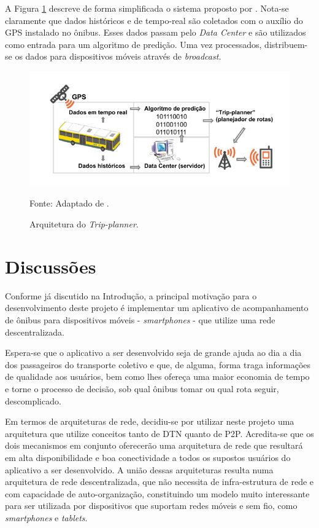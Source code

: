 A Figura \ref{fig:archLisbon} descreve de forma simplificada o sistema proposto por . Nota-se claramente que dados históricos e de tempo-real são coletados com o auxílio do GPS instalado no ônibus. Esses dados passam pelo \emph{Data Center} e são utilizados como entrada para um algoritmo de predição. Uma vez processados, distribuem-se os dados para dispositivos móveis através de \emph{broadcast.}

\begin{figure}[h]
\begin{center}
    \includegraphics[width=0.85\columnwidth]{../figs/arquitetura_tripplanner.png}
    \caption{Arquitetura do \emph{Trip-planner}.}Fonte: Adaptado de .
    \label{fig:archLisbon}
\end{center}
\end{figure}

\section{Discussões}
Conforme já discutido na Introdução, a principal motivação para o desenvolvimento deste projeto é implementar um aplicativo de acompanhamento de ônibus para dispositivos móveis - \textit{smartphones} - que utilize uma rede descentralizada. 

Espera-se que o aplicativo a ser desenvolvido seja de grande ajuda ao dia a dia dos passageiros do transporte coletivo e que, de alguma, forma traga informações de qualidade aos usuários, bem como lhes ofereça uma maior economia de tempo e torne o processo de decisão, sob qual ônibus tomar ou qual rota seguir, descomplicado.

Em termos de arquiteturas de rede, decidiu-se por utilizar neste projeto uma arquitetura que utilize conceitos tanto de DTN quanto de P2P. Acredita-se que os dois mecanismos em conjunto oferecerão uma arquitetura de rede que resultará em alta disponibilidade e boa conectividade a todos os supostos usuários do aplicativo a ser desenvolvido. A união dessas arquiteturas resulta numa arquitetura de rede descentralizada, que não necessita de infra-estrutura de rede e com capacidade de auto-organização, constituindo um modelo muito interessante para ser utilizada por dispositivos que suportam redes móveis e sem fio, como \textit{smartphones} e \textit{tablets}.

